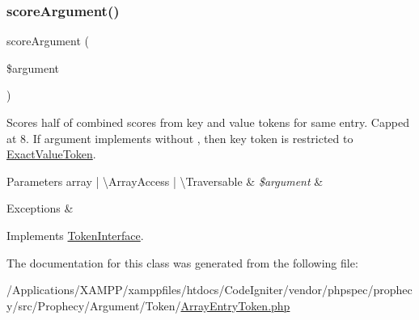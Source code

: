 \subsubsection{\texorpdfstring{score\+Argument()}{scoreArgument()}}
{\footnotesize\ttfamily score\+Argument (\begin{DoxyParamCaption}\item[{}]{\$argument }\end{DoxyParamCaption})}

Scores half of combined scores from key and value tokens for same entry. Capped at 8. If argument implements  without , then key token is restricted to \mbox{\hyperlink{class_prophecy_1_1_argument_1_1_token_1_1_exact_value_token}{Exact\+Value\+Token}}.


\begin{DoxyParams}[1]{Parameters}
array | \textbackslash{}\+Array\+Access | \textbackslash{}\+Traversable & {\em \$argument} & \\
\hline
\end{DoxyParams}

\begin{DoxyExceptions}{Exceptions}
{\em } & \\
\hline
\end{DoxyExceptions}


Implements \mbox{\hyperlink{interface_prophecy_1_1_argument_1_1_token_1_1_token_interface_a8d5bf47ab6eaa935458d5ad160e52822}{Token\+Interface}}.



The documentation for this class was generated from the following file\+:\begin{DoxyCompactItemize}
\item 
/\+Applications/\+X\+A\+M\+P\+P/xamppfiles/htdocs/\+Code\+Igniter/vendor/phpspec/prophecy/src/\+Prophecy/\+Argument/\+Token/\mbox{\hyperlink{_array_entry_token_8php}{Array\+Entry\+Token.\+php}}\end{DoxyCompactItemize}
